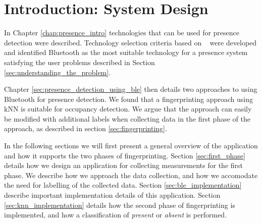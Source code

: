 \section{Introduction: System Design}
In Chapter \ref{chap:presence_intro} technologies that can be used for presence detection were described. 
Technology selection criteria based on \citeauthor{presence_ble_review}~\cite{presence_ble_review} were developed and identified Bluetooth as the most suitable technology for a presence system satisfying the user problems described in Section \ref{sec:understanding_the_problem}.

Chapter \ref{sec:presence_detection_using_ble} then details two approaches to using Bluetooth for presence detection. 
We found that a fingerprinting approach using kNN is suitable for occupancy detection. 
We argue that the approach can easily be modified with additional labels when collecting data in the first phase of the approach, as described in section \ref{sec:fingerprinting}.

In the following sections we will first present a general overview of the application and how it supports the two phases of fingerprinting. 
Section \ref{sec:first_phase} details how we design an application for collecting measurements for the first phase. 
We describe how we approach the data collection, and how we accomodate the need for labelling of the collected data.
Section \ref{sec:ble_implementation} describe important implementation details of this application. 
Section \ref{sec:knn_implementation} details how the second phase of fingerprinting is implemented, and how a classification of \textit{present} or \textit{absent} is performed.




